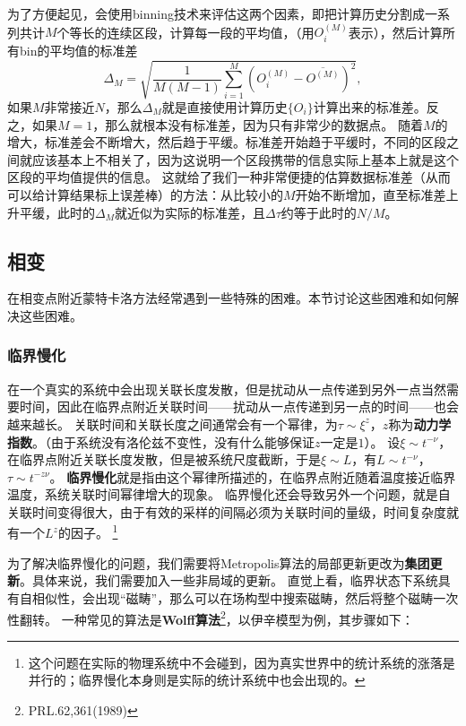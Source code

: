 \documentclass[hyperref, UTF8, a4paper]{ctexart}
\newcommand*{\concept}[1]{{\textbf{#1}}}
\begin{document}
为了方便起见，会使用binning技术来评估这两个因素，即把计算历史分割成一系列共计$M$个等长的连续区段，计算每一段的平均值，（用$O_i^{(M)}$表示），然后计算所有bin的平均值的标准差
\begin{equation}
    \Delta_M = \sqrt{\frac{1}{M(M-1)} \sum_{i=1}^M (O_i^{(M)} - \overline{O^{(M)}})^2},
\end{equation}
如果$M$非常接近$N$，那么$\Delta_M$就是直接使用计算历史$\{O_i\}$计算出来的标准差。反之，如果$M=1$，那么就根本没有标准差，因为只有非常少的数据点。
随着$M$的增大，标准差会不断增大，然后趋于平缓。标准差开始趋于平缓时，不同的区段之间就应该基本上不相关了，因为这说明一个区段携带的信息实际上基本上就是这个区段的平均值提供的信息。
这就给了我们一种非常便捷的估算数据标准差（从而可以给计算结果标上误差棒）的方法：从比较小的$M$开始不断增加，直至标准差上升平缓，此时的$\Delta_M$就近似为实际的标准差，且$\Delta \tau$约等于此时的$N/M$。

\subsection{相变}

在相变点附近蒙特卡洛方法经常遇到一些特殊的困难。本节讨论这些困难和如何解决这些困难。

\subsubsection{临界慢化}

在一个真实的系统中会出现关联长度发散，但是扰动从一点传递到另外一点当然需要时间，因此在临界点附近关联时间——扰动从一点传递到另一点的时间——也会越来越长。
关联时间和关联长度之间通常会有一个幂律，为$\tau \sim \xi^{z}$，$z$称为\concept{动力学指数}。（由于系统没有洛伦兹不变性，没有什么能够保证$z$一定是$1$）。
设$\xi \sim t^{-\nu}$，在临界点附近关联长度发散，但是被系统尺度截断，于是$\xi \sim L$，有$L \sim t^{-\nu}$，$\tau \sim t^{- z \nu}$。
\concept{临界慢化}就是指由这个幂律所描述的，在临界点附近随着温度接近临界温度，系统关联时间幂律增大的现象。
临界慢化还会导致另外一个问题，就是自关联时间变得很大，由于有效的采样的间隔必须为关联时间的量级，时间复杂度就有一个$L^{z}$的因子。%
\footnote{这个问题在实际的物理系统中不会碰到，因为真实世界中的统计系统的涨落是并行的；临界慢化本身则是实际的统计系统中也会出现的。}%

为了解决临界慢化的问题，我们需要将Metropolis算法的局部更新更改为\concept{集团更新}。具体来说，我们需要加入一些非局域的更新。
直觉上看，临界状态下系统具有自相似性，会出现“磁畴”，那么可以在场构型中搜索磁畴，然后将整个磁畴一次性翻转。
一种常见的算法是\concept{Wolff算法}\footnote{PRL.62,361(1989)}，以伊辛模型为例，其步骤如下：
\end{document}
